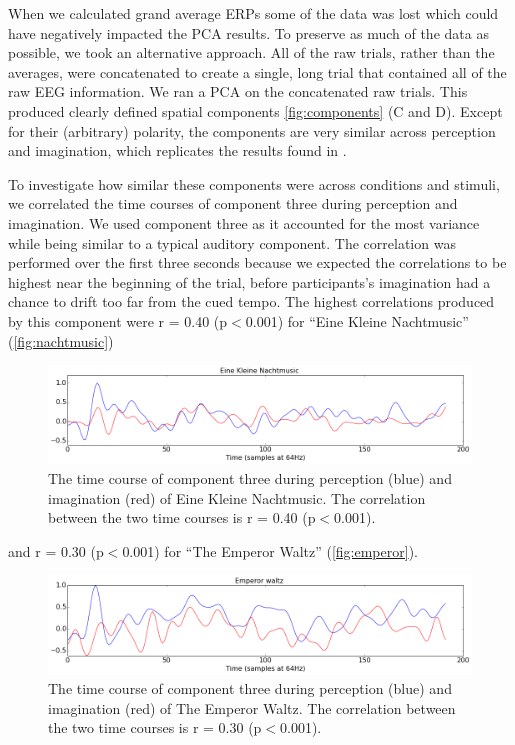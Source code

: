 When we calculated grand average \acp{ERP} some of the data was lost which could have negatively impacted the \ac{PCA} results.
To preserve as much of the data as possible, we took an alternative approach. 
All of the raw trials, rather than the averages, were concatenated to create a single, long trial that contained all of the raw EEG information.
We ran a \ac{PCA} on the concatenated raw trials. 
This produced clearly defined spatial components \autoref{fig:components} (C and D).
Except for their (arbitrary) polarity, the components are very similar across perception and imagination, which replicates the results found in \cite{schaefer_name_2011}.

To investigate how similar these components were across conditions and stimuli, we correlated the time courses of component three during perception and imagination.
We used component three as it accounted for the most variance while being similar to a typical auditory component.
The correlation was performed over the first three seconds because we expected the correlations to be highest near the beginning of the trial, before participants's imagination had a chance to drift too far from the cued tempo.
The highest correlations produced by this component were r = 0.40 (p$<$0.001) for ``Eine Kleine Nachtmusic'' (\autoref{fig:nachtmusic})
\begin{figure}[htbp]
  \centerline{\includegraphics[scale=0.4]{Figures/TimeCourse-EineKleineCorrelation}}
  \caption{The time course of component three during perception (blue) and imagination (red) of Eine Kleine Nachtmusic. The correlation between the two time courses is r = 0.40 (p$<$0.001).}
  \label{fig:nachtmusic}
\end{figure}
and r = 0.30 (p$<$0.001) for ``The Emperor Waltz'' (\autoref{fig:emperor}).
\begin{figure}[htbp]
  \centerline{\includegraphics[scale=0.4]{Figures/TimeCourse-EmperorCorrelation}}
  \caption{The time course of component three during perception (blue) and imagination (red) of The Emperor Waltz. The correlation between the two time courses is r = 0.30 (p$<$0.001).}
  \label{fig:emperor}
\end{figure}

